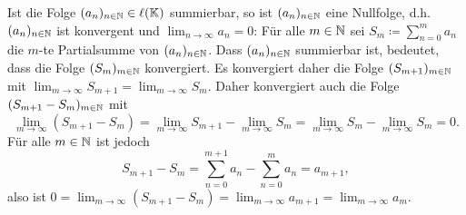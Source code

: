 \begin{bem}
 Ist die Folge $(a_n)_{n \in \mathbb{N}} \in \ell(\mathbb{K})$ summierbar, so ist $(a_n)_{n \in \mathbb{N}}$ eine Nullfolge, d.h.\ $(a_n)_{n \in \mathbb{N}}$ ist konvergent und $\lim_{n \to \infty} a_n = 0$: Für alle $m \in \mathbb{N}$ sei $S_m \coloneqq \sum_{n=0}^m a_n$ die $m$-te Partialsumme von $(a_n)_{n \in \mathbb{N}}$. Dass $(a_n)_{n \in \mathbb{N}}$ summierbar ist, bedeutet, dass die Folge $(S_m)_{m \in \mathbb{N}}$ konvergiert. Es konvergiert daher die Folge $(S_{m+1})_{m \in \mathbb{N}}$ mit $\lim_{m \to \infty} S_{m+1} = \lim_{m \to \infty} S_m$. Daher konvergiert auch die Folge $(S_{m+1} - S_m)_{m \in \mathbb{N}}$ mit
 \[
  \lim_{m \to \infty} (S_{m+1} - S_m)
  = \lim_{m \to \infty} S_{m+1} - \lim_{m \to \infty} S_m
  = \lim_{m \to \infty} S_m - \lim_{m \to \infty} S_m
  = 0.
 \]
 Für alle $m \in \mathbb{N}$ ist jedoch
 \[
  S_{m+1} - S_m
  = \sum_{n=0}^{m+1} a_n - \sum_{n=0}^m a_n
  = a_{m+1},
 \]
 also ist $0 = \lim_{m \to \infty} (S_{m+1} - S_m) = \lim_{m \to \infty} a_{m+1} = \lim_{m \to \infty} a_m$.
\end{bem}




